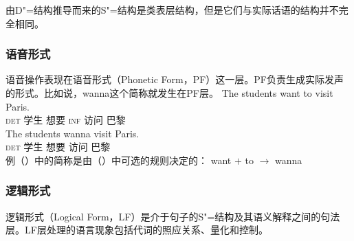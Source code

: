 由D"=结构推导而来的S"=结构是类表层结构，但是它们与实际话语的结构并不完全相同。

\subsubsection{语音形式}

语音操作表现在语音形式（Phonetic Form，PF）这一层。PF负责生成实际发声的形式。比如说，wanna这个简称就发生在PF层\citep[--21]{Chomsky81a}。
\eal
\ex 
\gll The students want to visit Paris.\\
\textsc{det} 学生 想要 \textsc{inf} 访问 巴黎\\
\ex 
\gll The students wanna visit Paris.\\
\textsc{det} 学生 想要 访问 巴黎\\
\zl
例（）中的简称是由（）中可选的规则决定的：
\ea
want $+$ to $\to$ wanna
\z
{}

\subsubsection{逻辑形式}

逻辑形式（Logical Form，LF）是介于句子的S"=结构及其语义解释之间的句法层。LF层处理的语言现象包括代词的照应关系、量化和控制。

